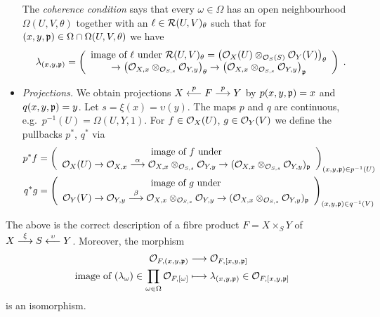 \documentclass[a4paper,parskip=half,numbers=enddot, DIV=12]{scrreprt}
\begin{document}
\begin{itemize}
	The \emph{coherence condition} says that every $\omega\in\Omega$ has an open neighbourhood $\Omega(U,V,\theta)$ together with an $\ell\in\mathcal{R}(U,V)_{\theta}$ such that for $(x,y,\mathfrak{p})\in\Omega\cap\Omega(U,V,\theta)$ we have
	\begin{align*}
		\lambda_{(x,y,\pp)}=\left(
		\begin{array}{c}
			\text{image of }\ell\text{ under }\Rr(U,V)_\theta=\left(\Oo_X(U)\otimes_{\Oo_S(S)}\Oo_Y(V)\right)_\theta\\
			\morphism\left(\Oo_{X,x}\otimes_{\Oo_{S,s}}\Oo_{Y,y}\right)_\theta\morphism\left(\Oo_{X,x}\otimes_{\Oo_{S,s}}\Oo_{Y,y}\right)_\pp
		\end{array}\right)\;.
	\end{align*}
	\item \emph{Projections.} We obtain projections $X\lmorphism[p]F\morphism[p] Y$ by $p(x,y,\mathfrak{p}) = x$ and $q(x,y,\mathfrak{p}) = y$. Let $s=\xi(x)=\upsilon(y)$. The maps $p$ and $q$ are continuous, e.g.\ $p^{-1}(U)=\Omega(U,Y,1)$. For $f\in\mathcal{O}_X(U)$, $g\in \mathcal{O}_Y(V)$ we define the pullbacks $p^*$, $q^*$ via
	\begin{align*}
        p^*f&= \left(
        \begin{array}{c}
	        \text{image of } f\text{ under}\\
	         \Oo_X(U) \morphism\Oo_{X,x} \morphism[\alpha] \Oo_{X,x}\otimes_{\Oo_{S,s}}\Oo_{Y,y} \morphism (\Oo_{X,x}\otimes_{\Oo_{S,s}}\Oo_{Y,y})_\pp
        \end{array}\right)_{(x,y,\pp) \in p^{-1}(U)}\\
        q^*g&=  \left(
        \begin{array}{c}
	        \text{image of } g\text{ under}\\
	         \Oo_Y(V) \morphism\Oo_{Y,y} \morphism[\beta] \Oo_{X,x}\otimes_{\Oo_{S,s}}\Oo_{Y,y} \morphism (\Oo_{X,x}\otimes_{\Oo_{S,s}}\Oo_{Y,y})_\pp
	         \end{array}\right)_{(x,y,\pp) \in q^{-1}(V)}
	\end{align*}
\end{itemize}
\begin{prop}
    The above is the correct description of a fibre product $F=X\times_SY$ of $X\morphism[\xi]S\lmorphism[\upsilon]Y$. Moreover, the morphism
    \begin{align*}
        \Oo_{F,(x,y,\pp)} &\morphism \Oo_{F,[x,y,\pp]}\\
        \text{image of }(\lambda_\omega)\in\prod_{\omega\in\Omega}\Oo_{F,[\omega]}&\longmapsto\lambda_{(x,y,\pp)}\in\Oo_{F,[x,y,\pp]}
    \end{align*}
    is an isomorphism.
\end{prop}
\end{document}
